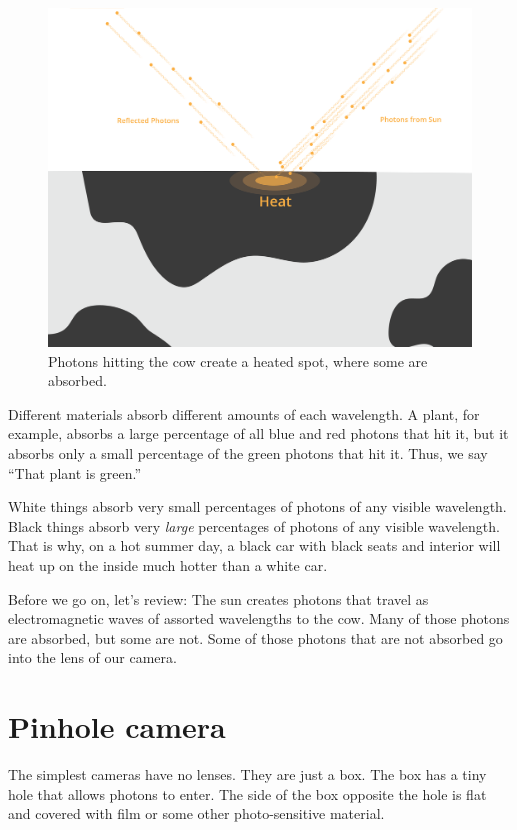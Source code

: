 \begin{figure}[htbp]
    \centering
    \includegraphics[width=1\textwidth]{cow4.png}
    \caption{Photons hitting the cow create a heated spot, where some are absorbed.}
    \label{fig:example}
\end{figure}
Different materials absorb different amounts of each wavelength. A
plant, for example, absorbs a large percentage of all blue and red
photons that hit it, but it absorbs only a small percentage of the
green photons that hit it. Thus, we say ``That plant is green.''

White things absorb very small percentages of photons of any visible
wavelength. Black things absorb very \emph{large} percentages of
photons of any visible wavelength. That is why, on a hot summer day, a black car with black 
seats and interior will heat up on the inside much hotter than a white car. 

Before we go on, let's review: The sun creates photons that travel as
electromagnetic waves of assorted wavelengths to the cow. Many of
those photons are absorbed, but some are not. Some of those photons
that are not absorbed go into the lens of our camera.

\section{Pinhole camera}
The simplest cameras have no lenses. They are just a box. The box has
a tiny hole that allows photons to enter. The side of the box
opposite the hole is flat and covered with film or some other
photo-sensitive material.

